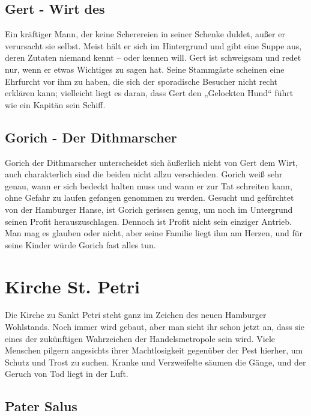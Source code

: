 
\subsection{Gert - Wirt des }

Ein kräftiger Mann, der keine Scherereien in seiner Schenke duldet, außer er verursacht sie selbst. Meist hält er sich im Hintergrund und gibt eine Suppe aus, deren Zutaten niemand kennt – oder kennen will. Gert ist schweigsam und redet nur, wenn er etwas Wichtiges zu sagen hat. Seine Stammgäste scheinen eine Ehrfurcht vor ihm zu haben, die sich der sporadische Besucher nicht recht erklären kann; vielleicht liegt es daran, dass Gert den „Gelockten Hund“ führt wie ein Kapitän sein Schiff.

\subsection{Gorich - Der Dithmarscher}

Gorich der Dithmarscher unterscheidet sich äußerlich nicht von Gert dem Wirt, auch charakterlich sind die beiden nicht allzu verschieden. Gorich weiß sehr genau, wann er sich bedeckt halten muss und wann er zur Tat schreiten kann, ohne Gefahr zu laufen gefangen genommen zu werden. Gesucht und gefürchtet von der Hamburger Hanse, ist Gorich gerissen genug, um noch im Untergrund seinen Profit herauszuschlagen. Dennoch ist Profit nicht sein einziger Antrieb. Man mag es glauben oder nicht, aber seine Familie liegt ihm am Herzen, und für seine Kinder würde Gorich fast alles tun.


\section{Kirche St. Petri}

Die Kirche zu Sankt Petri steht ganz im Zeichen des neuen Hamburger Wohlstands. Noch immer wird gebaut, aber man sieht ihr schon jetzt an, dass sie eines der zukünftigen Wahrzeichen der Handelsmetropole sein wird. Viele Menschen pilgern angesichts ihrer Machtlosigkeit gegenüber der Pest hierher, um Schutz und Trost zu suchen. Kranke und Verzweifelte säumen die Gänge, und der Geruch von Tod liegt in der Luft.


\subsection{Pater Salus}

